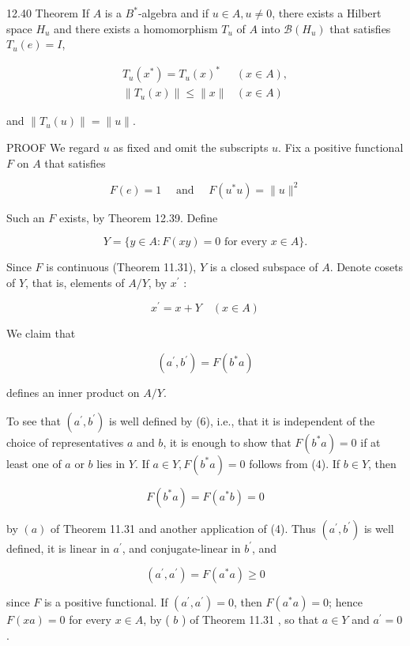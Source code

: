 \documentclass[10pt]{article}
\begin{document}
12.40 Theorem If $A$ is a $B^{*}$-algebra and if $u \in A, u \neq 0$, there exists a Hilbert space $H_{u}$ and there exists a homomorphism $T_{u}$ of $A$ into $\mathscr{B}\left(H_{u}\right)$ that satisfies $T_{u}(e)=I$,

$$
\begin{array}{cc}
T_{u}\left(x^{*}\right)=T_{u}(x)^{*} & (x \in A), \\
\left\|T_{u}(x)\right\| \leq\|x\| & (x \in A)
\end{array}
$$

and $\left\|T_{u}(u)\right\|=\|u\|$.

PROOF We regard $u$ as fixed and omit the subscripts $u$. Fix a positive functional $F$ on $A$ that satisfies

$$
F(e)=1 \quad \text { and } \quad F\left(u^{*} u\right)=\|u\|^{2}
$$

Such an $F$ exists, by Theorem 12.39. Define

$$
Y=\{y \in A: F(x y)=0 \text { for every } x \in A\} .
$$

Since $F$ is continuous (Theorem 11.31), $Y$ is a closed subspace of $A$. Denote cosets of $Y$, that is, elements of $A / Y$, by $x^{\prime}$ :

$$
x^{\prime}=x+Y \quad(x \in A)
$$

We claim that

$$
\left(a^{\prime}, b^{\prime}\right)=F\left(b^{*} a\right)
$$

defines an inner product on $A / Y$.

To see that $\left(a^{\prime}, b^{\prime}\right)$ is well defined by (6), i.e., that it is independent of the choice of representatives $a$ and $b$, it is enough to show that $F\left(b^{*} a\right)=0$ if at least one of $a$ or $b$ lies in $Y$. If $a \in Y, F\left(b^{*} a\right)=0$ follows from (4). If $b \in Y$, then

$$
F\left(b^{*} a\right)=F\left(a^{*} b\right)=0
$$

by $(a)$ of Theorem 11.31 and another application of (4). Thus $\left(a^{\prime}, b^{\prime}\right)$ is well defined, it is linear in $a^{\prime}$, and conjugate-linear in $b^{\prime}$, and

$$
\left(a^{\prime}, a^{\prime}\right)=F\left(a^{*} a\right) \geq 0
$$

since $F$ is a positive functional. If $\left(a^{\prime}, a^{\prime}\right)=0$, then $F\left(a^{*} a\right)=0$; hence $F(x a)=0$ for every $x \in A$, by ( $b$ ) of Theorem 11.31 , so that $a \in Y$ and $a^{\prime}=0$.
\end{document}
